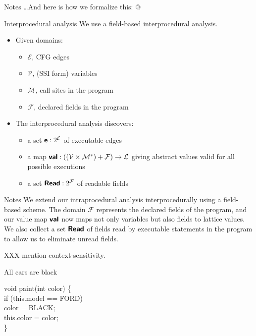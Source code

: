 \documentclass[%
pdf,
colorBG,
slideColor,
nototal,
oqe
]{prosper}
\renewcommand{\yellow}{\colC}
\newcommand{\func}[1]{\ensuremath{\text{\sffamily\bfseries #1}}}
\newenvironment{talknotes}{\begin{slide}{Notes}\tiny}{\end{slide}}
\begin{document}
\begin{talknotes}
\ldots And here is how we formalize this: @
\end{talknotes}

\begin{slide}{Interprocedural analysis}
We use a {\yellow field-based} interprocedural analysis.
\begin{itemize}
\item Given domains:
\begin{itemize}
\item $\mathcal{E}$, CFG edges
\item $\mathcal{V}$, (SSI form) variables
\item $\mathcal{M}$, call sites in the program
\item $\mathcal{F}$, declared fields in the program
\end{itemize}
\item The interprocedural analysis discovers:
\begin{itemize}
\item a set $\func{e}:2^\mathcal{E}$ of executable edges
\item a map $\func{val}:\left(\left(\mathcal{V}\times\mathcal{M}^*\right)+\mathcal{F}\right)\to\mathcal{L}$
 giving abstract values valid for all possible executions
\item a set $\func{Read}:2^\mathcal{F}$ of readable fields
\end{itemize}
\end{itemize}
\end{slide}
\begin{talknotes}
We extend our intraprocedural analysis interprocedurally using a
field-based scheme.  The domain $\mathcal{F}$ represents the declared
fields of the program, and our value map $\func{val}$ now maps not
only variables but also fields to lattice values.  We also collect a
set $\func{Read}$ of fields read by executable statements in the
program to allow us to eliminate unread fields.

XXX mention context-sensitivity.
\end{talknotes}

\begin{slide}{All cars are black}
\vspace{1cm}
\begin{samplecode}
void paint(int color) \{\\
\>if (this.model == FORD)\\
\>\>color = BLACK;\\
\>this.color = color;\\
\}\\
\end{samplecode}
\end{slide}
\end{document}
